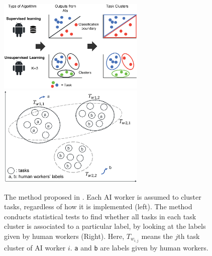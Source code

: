 
\begin{figure}
    \centering
    \includegraphics[width=70mm]{submissions/morishima/figures/task_cluster.eps}
    \hspace{10mm}
    \includegraphics[width=70mm]{submissions/morishima/figures/proposed_method.eps}
    \caption{The method proposed in \cite{KWM20}. Each AI worker is assumed to cluster tasks, regardless of how it is implemented (left). The method conducts statistical tests to find whether all tasks in each task cluster is associated to a particular label, by looking at the labels given by human workers (Right). Here, $T_{w_{i,j}}$ means the $j$th task cluster of AI worker $i$. {\tt a} and {\tt b} are labels given by human workers.}
    \label{fig:hactap}
\end{figure}

